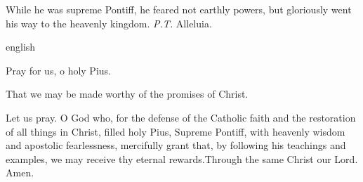 \begin{enpars} \noindent While he was supreme Pontiff, he feared not earthly powers, but gloriously went his way to the heavenly kingdom. \textit{P.T.} Alleluia. \end{enpars}

{english}{\noindent \vv Pray for us, o holy Pius.

\noindent \rr That we may be made worthy of the promises of Christ.

\noindent Let us pray. O God who, for the defense of the Catholic faith and the restoration of all things in Christ, filled holy Pius, Supreme Pontiff, with heavenly wisdom and apostolic fearlessness, mercifully grant that, by following his teachings and examples, we may receive thy eternal rewards.Through the same Christ our Lord. Amen.}
